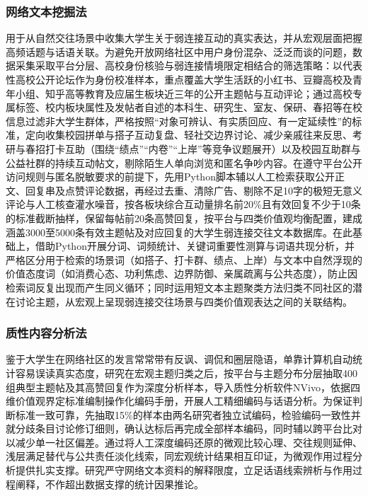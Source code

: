\subsubsection{网络文本挖掘法}

用于从自然交往场景中收集大学生关于弱连接互动的真实表达，并从宏观层面把握高频话题与话语关联。为避免开放网络社区中用户身份混杂、泛泛而谈的问题，数据采集采取平台分层、高校身份核验与弱连接情境限定相结合的筛选策略：以代表性高校公开论坛作为身份校准样本，重点覆盖大学生活跃的小红书、豆瓣高校及青年小组、知乎高等教育及应届生板块近三年的公开主题帖与互动评论；通过高校专属标签、校内板块属性及发帖者自述的本科生、研究生、室友、保研、春招等在校信息过滤非大学生群体，严格按照“对象可辨认、有实质回应、有一定延续性”的标准，定向收集校园拼单与搭子互动复盘、轻社交边界讨论、减少亲戚往来反思、考研与春招打卡互助（围绕“绩点”“内卷”“上岸”等竞争议题展开）以及校园互助群与公益社群的持续互动帖文，剔除陌生人单向浏览和匿名争吵内容。在遵守平台公开访问规则与匿名脱敏要求的前提下，先用Python脚本辅以人工检索获取公开正文、回复串及点赞评论数据，再经过去重、清除广告、剔除不足10字的极短无意义评论与人工核查灌水噪音，按各板块综合互动量排名前20\%且有效回复不少于10条的标准截断抽样，保留每帖前20条高赞回复，按平台与四类价值观均衡配置，建成涵盖3000至5000条有效主题帖及对应回复的大学生弱连接交往文本数据库。在此基础上，借助Python开展分词、词频统计、关键词重要性测算与词语共现分析，并严格区分用于检索的场景词（如搭子、打卡群、绩点、上岸）与文本中自然浮现的价值态度词（如消费心态、功利焦虑、边界防御、亲属疏离与公共态度），防止因检索词反复出现而产生同义循环；同时运用短文本主题聚类方法归类不同社区的潜在讨论主题，从宏观上呈现弱连接交往场景与四类价值观表达之间的关联结构。

\subsubsection{质性内容分析法}

鉴于大学生在网络社区的发言常常带有反讽、调侃和圈层隐语，单靠计算机自动统计容易误读真实态度，研究在宏观主题归类之后，按平台与主题分布分层抽取400组典型主题帖及其高赞回复作为深度分析样本，导入质性分析软件NVivo，依据四维价值观界定标准编制操作化编码手册，开展人工精细编码与话语分析。为保证判断标准一致可靠，先抽取15\%的样本由两名研究者独立试编码，检验编码一致性并就分歧条目讨论修订细则，确认达标后再完成全部样本编码，同时辅以跨平台比对以减少单一社区偏差。通过将人工深度编码还原的微观比较心理、交往规则延伸、浅层满足替代与公共责任淡化线索，同宏观统计结果相互印证，为微观作用过程分析提供扎实支撑。研究严守网络文本资料的解释限度，立足话语线索辨析与作用过程阐释，不作超出数据支撑的统计因果推论。

